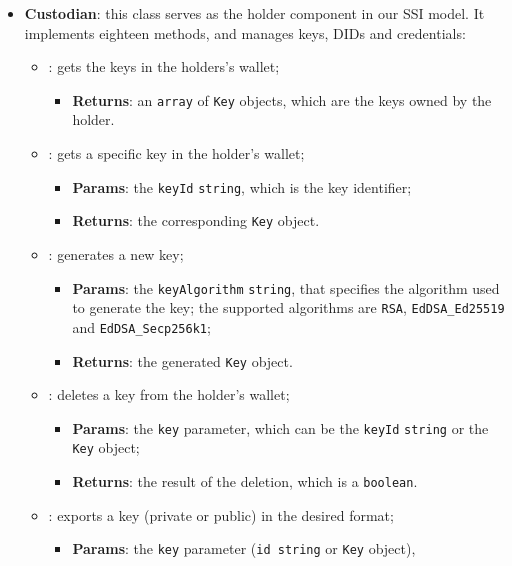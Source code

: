 \begin{itemize}
    \item \textbf{Custodian}: this class serves as the holder component in our
    SSI model. It implements eighteen methods, and manages keys, DIDs and credentials:
    \begin{itemize}
        \setlength{\itemsep}{0.4cm}
        \item[] : gets the keys in the holders's wallet;
        \begin{itemize}
            \item \textbf{Returns}: an \texttt{array} of \texttt{Key} objects, which are the keys
            owned by the holder.
        \end{itemize}
        \item[] : gets a specific key in the holder's wallet;
        \begin{itemize}
            \item \textbf{Params}: the \texttt{keyId} \texttt{string}, which is the key identifier;
            \item \textbf{Returns}: the corresponding \texttt{Key} object.
        \end{itemize}
        \item[] : generates a new key;
        \begin{itemize}
            \item \textbf{Params}: the \texttt{keyAlgorithm} \texttt{string}, that specifies
            the algorithm used to generate the key; the supported algorithms are 
            \texttt{RSA}, \texttt{EdDSA\_Ed25519} and \texttt{EdDSA\_Secp256k1};
            \item \textbf{Returns}: the generated \texttt{Key} object.
        \end{itemize}
        \item[] : deletes a key from the holder's wallet;
        \begin{itemize}
            \item \textbf{Params}: the \texttt{key} parameter, which can be the \texttt{keyId}
            \texttt{string} or the \texttt{Key} object;
            \item \textbf{Returns}: the result of the deletion, which is a \texttt{boolean}.
        \end{itemize}
        \item[] : exports a key (private or public) in the desired format;
        \begin{itemize}
            \item \textbf{Params}: the \texttt{key} parameter (\texttt{id string} or \texttt{Key} object),

\end{itemize}
\end{itemize}
\end{itemize}
